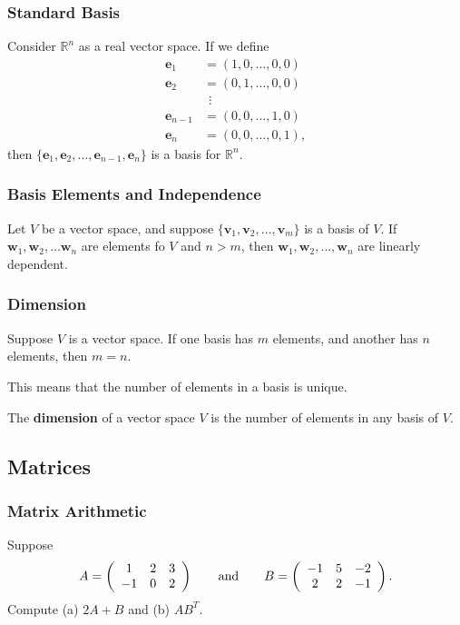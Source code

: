 \documentclass{beamer}
\begin{document}
\begin{frame}
\frametitle{Standard Basis}
Consider $\mathbb{R}^n$ as a real vector space. If we define
\begin{align*}
{\boldsymbol e_1} 		&= (1, 0, \ldots, 0, 0)\\
{\boldsymbol e_2} 		&= (0, 1, \ldots, 0, 0)\\
					&\ \ \vdots\\
{\boldsymbol e_{n - 1}} 	&= (0, 0, \ldots, 1, 0)\\
{\boldsymbol e_n} 		&= (0, 0, \ldots, 0, 1),
\end{align*}
then $\{{\boldsymbol e_1}, {\boldsymbol e_2}, \ldots, {\boldsymbol e_{n - 1}}, {\boldsymbol e_n}\}$ is a basis for $\mathbb{R}^n$.
\end{frame}

\begin{frame}
\frametitle{Basis Elements and Independence}
\begin{Theorem}
Let $V$ be a vector space, and suppose $\{ {\boldsymbol v_1}, {\boldsymbol v_2},\ldots, {\boldsymbol v_m}\}$ is a basis of $V$. If ${\boldsymbol w_1}, {\boldsymbol w_2}, \ldots {\boldsymbol w_n}$ are elements fo $V$ and $n > m$, then ${\boldsymbol w_1}, {\boldsymbol w_2},\ldots, {\boldsymbol w_n}$ are linearly dependent.
\end{Theorem}
\end{frame}

\begin{frame}
\frametitle{Dimension}
\begin{Theorem}
Suppose $V$ is a vector space. If one basis has $m$ elements, and another has $n$ elements, then $m = n$.
\end{Theorem}

This means that the number of elements in a basis is unique. 

\begin{Definition}
The {\bf dimension} of a vector space $V$ is the number of elements in any basis of $V$.
\end{Definition}

\end{frame}

\subsection{Matrices} 

\begin{frame}[t]
\frametitle{Matrix Arithmetic}
\begin{Example}
Suppose 
$$
A = \left(\begin{array}{c c c} 1	&	2	&	3\\	-1	&	0	&	2\end{array}\right)\qquad\text{and}\qquad B = \left(\begin{array}{c c c} -1	&	5	&	-2\\	2	&	2	&	-1\end{array}\right).
$$
Compute (a) $2 A + B$ and (b) $A B^T$.
\end{Example}

\end{frame}
\end{document}
